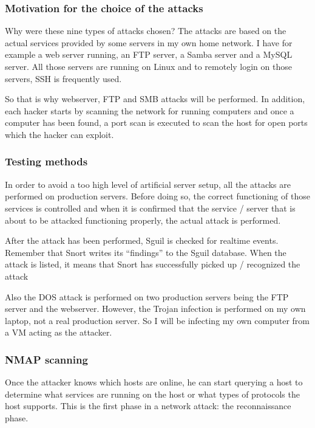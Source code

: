 \subsubsection{Motivation for the choice of the attacks}

Why were these nine types of attacks chosen? The attacks are based on the actual services provided by some servers in my own home network. I have for example a web server running, an FTP server, a Samba server and a MySQL server. All those servers are running on Linux and to remotely login on those servers, SSH is frequently used.

So that is why webserver, FTP and SMB attacks will be performed. In addition, each hacker starts by scanning the network for running computers and once a computer has been found, a port scan is executed to scan the host for open ports which the hacker can exploit.

\subsubsection{Testing methods}

In order to avoid a too high level of artificial server setup, all the attacks are performed on production servers. Before doing so, the correct functioning of those services is controlled and when it is confirmed that the service / server that is about to be attacked functioning properly, the actual attack is performed.

After the attack has been performed, Sguil is checked for realtime events. Remember that Snort writes its ``findings'' to the Sguil database. When the attack is listed, it means that Snort has successfully picked up / recognized the attack

Also the DOS attack is performed on two production servers being the FTP server and the webserver. However, the Trojan infection is performed on my own laptop, not a real production server. So I will be infecting my own computer from a VM acting as the attacker.

\subsubsection{NMAP scanning}

Once the attacker knows which hosts are online, he can start querying a host to determine what services are running on the host or what types of protocols the host supports. This is the first phase in a network attack: the reconnaissance phase. 

